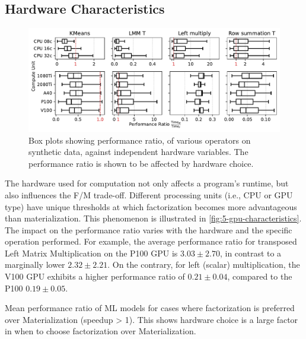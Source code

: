 \subsection{Hardware Characteristics}
\begin{figure}[ht]
    \centering
    \includegraphics[width=\linewidth]{chapters/05_cost_estimation/figures/motivation_speedup_per_operator_per_gpu.pdf}
    \caption[Box plots showing performance ratio against hardware]{Box plots showing performance ratio, of various operators on synthetic data, against independent hardware variables. The performance ratio is shown to be affected by hardware choice.}
    \label{fig:5-gpu-characteristics}
\end{figure}
The hardware used for computation not only affects a program's runtime, but also influences the F/M trade-off. Different processing units (i.e., CPU or GPU type) have unique thresholds at which factorization becomes more advantageous than materialization. This phenomenon is illustrated in \autoref{fig:5-gpu-characteristics}. The impact on the performance ratio varies with the hardware and the specific operation performed. For example, the average performance ratio for transposed Left Matrix Multiplication on the P100 GPU is $3.03\pm2.70$, in contrast to a marginally lower $2.32\pm2.21$. On the contrary, for left (scalar) multiplication, the V100 GPU exhibits a higher performance ratio of $0.21\pm0.04$, compared to the P100 $0.19\pm0.05$.

\begin{table}[ht]
    \centering
    
    \caption[Performance ratio of ML models for cases where factorization has positive impact.]{Mean performance ratio of ML models for cases where factorization is preferred over Materialization (speedup > 1). This shows hardware choice is a large factor in when to choose factorization over Materialization.}
    \label{tab:5-speedup-per-gpu}
\end{table}

